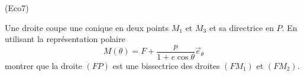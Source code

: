 \begin{tiny}(Eco7)\end{tiny} Une droite coupe une conique en deux points $M_1$ et $M_3$ et sa directrice en $P$. En utilisant la représentation polaire
\begin{displaymath}
 M(\theta) = F + \frac{p}{1+e\cos \theta}\overrightarrow{e}_\theta
\end{displaymath}
 montrer que la droite $(FP)$ est une bissectrice des droites $(FM_1)$ et $(FM_2)$.